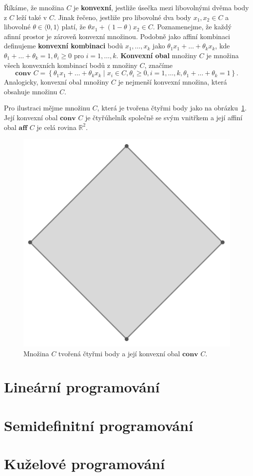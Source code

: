 \noindent Říkáme, že množina $C$ je \textbf{konvexní}, jestliže úsečka mezi libovolnými dvěma body z $C$ leží také v $C$. Jinak řečeno, jestliže pro libovolné dva body $x_1, x_2 \in C$ a libovolné $\theta \in \langle 0, 1 \rangle$ platí, že $\theta x_1 + (1 - \theta) x_2 \in C$. Poznamenejme, že každý afinní prostor je zároveň konvexní množinou. Podobně jako affiní kombinaci definujeme \textbf{konvexní kombinaci} bodů $x_1, \dots, x_k$ jako $\theta_1 x_1 + \dots + \theta_k x_k$, kde $\theta_1 + \dots + \theta_k = 1, \theta_i \geq 0$ pro $i = 1, \dots, k$. \textbf{Konvexní obal} množiny $C$ je množina všech konvexních kombinací bodů z množiny $C$, značíme
$$
    \textbf{conv }C = \left\{ \theta_1 x_1 + \dots + \theta_k x_k \mid x_i \in C, \theta_i \geq 0, i = 1, \dots, k, \theta_1 + \dots + \theta_k = 1 \right\}.
$$
Analogicky, konvexní obal množiny $C$ je nejmenší konvexní množina, která obsahuje množinu $C$.

\noindent Pro ilustraci mějme množinu $C$, která je tvořena čtyřmi body jako na obrázku~\ref{img:conv}. Její konvexní obal $\textbf{conv }C$ je čtyřúhelník společně se svým vnitřkem a její affiní obal $\textbf{aff }C$ je celá rovina $\mathbb{R}^2$.

\begin{figure}
    \centering
    \includegraphics[width=0.3\columnwidth]{img/conv.png}
    \caption{Množina $C$ tvořená čtyřmi body a její konvexní obal $\textbf{conv }C$.}
    \label{img:conv}
\end{figure}

\chapter{Lineární programování}

\chapter{Semidefinitní programování}

\chapter{Kuželové programování}
